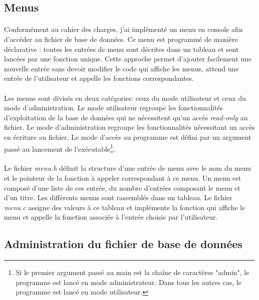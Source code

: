 \documentclass{article}
\begin{document}
    \subsection{Menus}
    \paragraph{}
    Conformément au cahier des charges, j'ai implémenté un menu en console afin d'accéder au fichier de base de données. Ce menu est programmé de manière déclarative : toutes les entrées de menu sont décrites dans un tableau et sont lancées par une fonction unique. Cette approche permet d'ajouter facilement une nouvelle entrée sans devoir modifier le code qui affiche les menus, attend une entrée de l'utilisateur et appelle les fonctions correspondantes.

    \paragraph{}
    Les menus sont divisés en deux catégories: ceux du mode utilisateur et ceux du mode d'administration. Le mode utilisateur regroupe les fonctionnalités d'exploitation de la base de données qui ne nécessitent qu'un accès \emph{read-only} au fichier. Le mode d'administration regroupe les fonctionnalités nécessitant un accès en écriture au fichier. Le mode d'accès au programme est défini par un argument passé au lancement de l'exécutable\footnote{Si le premier argument passé au main est la chaîne de caractères "admin", le programme est lancé en mode administrateur. Dans tous les autres cas, le programme est lancé en mode utilisateur.}.

    \paragraph{}
    Le fichier \emph{menu.h} définit la structure d'une entrée de menu avec le nom du menu et le pointeur de la fonction à appeler correspondant à ce menu. Un menu est composé d'une liste de ces entrée, du nombre d'entrées composant le menu et d'un titre. Les différents menus sont rassemblés dans un tableau. Le fichier \emph{menu.c} assigne des valeurs à ce tableau et implémente la fonction qui affiche le menu et appelle la fonction associée à l'entrée choisie par l'utilisateur.


    \subsection{Administration du fichier de base de données}
\end{document}
